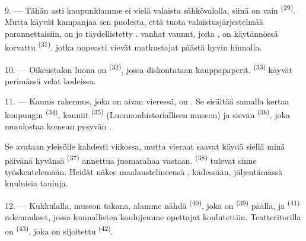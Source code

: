 \VUsaut{4.0mm}
\VUsaut{3.4mm}

9. --- Tähän asti kaupunkiamme ei vielä valaista sähkövalolla, siinä on vain
 \textsuperscript{(29)}. Mutta 
käyvät kampanjaa sen puolesta, että tuota valaistusjärjestelmää parannettaisiin,
 on jo täydellistetty .  vanhat vaunut, joita 
, on käytännössä korvattu 
\textsuperscript{(31)}, jotka nopeasti vievät matkustajat 
päästä  hyvin  hinnalla.

10. --- Oikeustalon luona on  \textsuperscript{(32)}, jossa
diskontataan kauppapaperit.  \textsuperscript{(33)}
käyvät perimässä velat kodeissa.

\VUsaut{4.0mm}
\VUsaut{3.4mm}

11. --- Kaunis rakennus, joka on aivan vieressä, on . Se sisältää
samalla kertaa kaupungin  \textsuperscript{(34)}, kauniit
 \textsuperscript{(35)}
(Luonnonhistoriallisen museon) ja sievän 
\textsuperscript{(36)}, joka muodostaa komean pysyvän .

Se avataan yleisölle kahdesti viikossa, mutta vieraat saavat käydä siellä minä
päivänä hyvänsä  \textsuperscript{(37)} annettua
juomarahaa vastaan.  \textsuperscript{(38)} tulevat sinne
työskentelemään. Heidät näkee maalaustelineensä ,
 kädessään, jäljentämässä kuuluisia tauluja.

12. --- Kukkulalla, museon takana, alamme nähdä 
\textsuperscript{(40)}, joka on  \textsuperscript{(39)}
päällä, ja  \textsuperscript{(41)} rakennukset, jossa
kunnallisten koulujemme opettajat koulutettiin. Teatteritorilla on
 \textsuperscript{(43)}, joka on sijoitettu
 \textsuperscript{(42)}.

\VUsaut{5.0mm}
\VUsaut{3.0mm}

\VUsaut{3.4mm}

